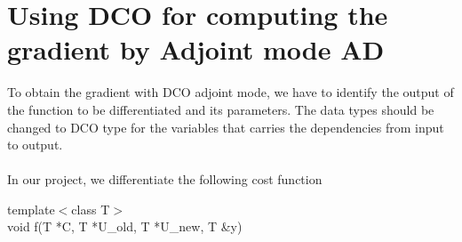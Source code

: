 \documentclass[10pt,a4paper]{report}
\begin{document}
\newpage
\appendix
\chapter{ Using DCO for computing the gradient by Adjoint mode AD}

To obtain the gradient with DCO adjoint mode, we have to identify the output of the function to be differentiated and its parameters. The data types should be changed to DCO type for the variables that carries the dependencies from input to output.\\
\\
In our project, we differentiate the following cost function
\begin{snugshade}
\begin{flushleft}
template$<$class T$>$\\ 
void f(T *C, T *U\_old, T *U\_new, T \&y)
\end{flushleft}
\end{snugshade}
\end{document}
